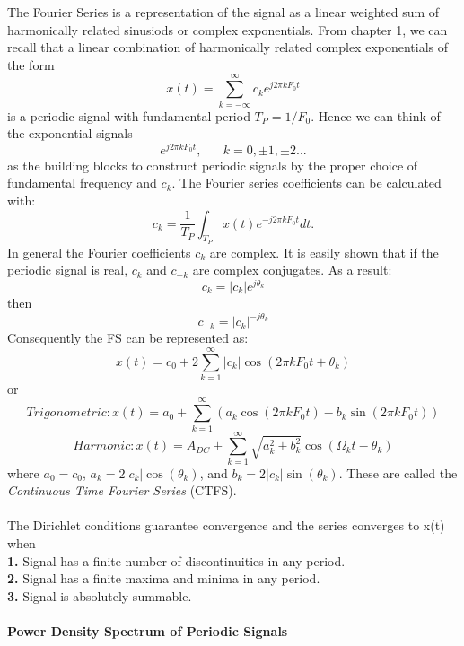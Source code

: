 \documentclass{article} %
\begin{document}
    The Fourier Series is a representation of the signal as a linear weighted sum of harmonically related sinusiods or complex exponentials. From chapter 1, we can recall that a linear combination of harmonically related complex exponentials of the form
    \begin{equation}
 	x(t) = \sum_{k=-\infty}^{\infty}c_ke^{j2\pi kF_0t}     
	\end{equation}
	is a periodic signal with fundamental period $T_P = 1/F_0$. Hence we can think of the exponential signals
	\begin{equation}
 	 {e^{j2\pi kF_0t}, \;\;\;\;\;\; k = 0, \pm 1, \pm 2 ...}
	\end{equation}
	as the building blocks to construct periodic signals by the proper choice of fundamental frequency and $c_k$. The Fourier series coefficients can be calculated with:
	\begin{equation}
 	c_k = \frac{1}{T_P} \int_{T_P} x(t)e^{-j2 \pi kF_0t}dt.
	\end{equation}
	In general the Fourier coefficients $c_k$ are complex. It is easily shown that if the periodic signal is real, $c_k$ and $c_{-k}$ are complex conjugates. As a result:
	\begin{equation}
 	c_k = |c_k|e^{j\theta_{k}}
	\end{equation}
	then
	\begin{equation}
 	c_{-k} = |c_k|^{-j\theta_{k}}
	\end{equation}
	Consequently the FS can be represented as:
	\begin{equation}
 	x(t) = c_0 + 2\sum_{k=1}^{\infty}|c_k|\cos(2\pi k F_0t + \theta_{k})    
	\end{equation}
	or 
	\begin{equation}
 	Trigonometric: x(t) = a_0 + \sum_{k=1}^{\infty}(a_k\cos(2\pi kF_0t) - b_k\sin(2\pi kF_0t))
	\end{equation}
	\begin{equation}
 	Harmonic: x(t) = A_{DC} + \sum_{k=1}^{\infty}\sqrt{a_k^2+b_k^2} \cos(\Omega_{k}t - \theta_{k}) 
	\end{equation}
	where $a_0 = c_0$, $a_k = 2|c_k|\cos(\theta_{k})$, and $b_k = 2|c_k|\sin(\theta_{k})$. These are called the \textit{Continuous Time
	Fourier Series} (CTFS).\\
	\\
	The Dirichlet conditions guarantee convergence and the series converges to x(t) when\\
	\textbf{1.} Signal has a finite number of discontinuities in any period.\\
	\textbf{2.} Signal has a finite maxima and minima in any period.\\
	\textbf{3.} Signal is absolutely summable. \\
	\\
	\textbf{Power Density Spectrum of Periodic Signals}\\
	
\end{document}
